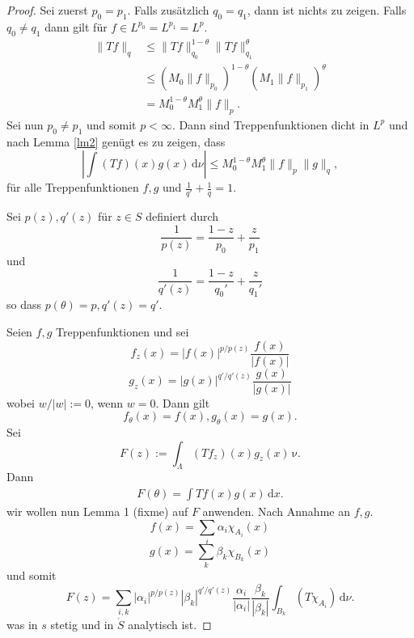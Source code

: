 \documentclass[
paper=a4,
bibtotocnumbered,
liststotocnumbered,
tablecaptionabove,
pointlessnumbers,
twoside,
openright,
10pt
]
{report}
\theoremstyle{definition}
\numberwithin{equation}{chapter}
\begin{document}
\begin{proof}
Sei zuerst $p_0=p_1$. Falls zusätzlich  $q_0=q_1$, dann ist nichts zu zeigen.  Falls $q_0\neq q_1$ dann gilt für $f\in L^{p_0} = L^{p_1} = L^p$.
\begin{align*}
\| Tf\|_q &\le \| Tf\|_{q_0}^{1-\theta} \| Tf\|_{q_1}^\theta\\
&\le (M_0 \| f\|_{p_0})^{1-\theta} (M_1 \| f\|_{p_1} )^\theta \\
&= M_0^{1-\theta} M_1^\theta \| f\|_p.
\end{align*}
Sei nun $p_0 \neq p_1$ und somit $p<\infty$. Dann sind Treppenfunktionen dicht in $L^p$ und nach Lemma \ref{lm2} genügt es zu zeigen, dass
\begin{equation}
|\int (Tf) (x) g(x) \, \mathrm d\nu| \le M_0^{1-\theta} M_1^\theta \| f\|_p \| g\|_q,
\end{equation}
für alle Treppenfunktionen $f,g$ und $\frac{1}{q'} + \frac{1}{q} =1$.

Sei $p(z), q'(z)$ für $z\in S$ definiert durch
\begin{equation}
\frac{1}{p(z)} = \frac{1-z}{p_0} + \frac{z}{p_1} 
\end{equation}
und
\begin{equation}
\frac{1}{q'(z)} = \frac{1-z}{q_0'} + \frac{z}{q_1'}
\end{equation}
so dass $p(\theta)=p, q'(z)=q'$.

Seien $f,g$ Treppenfunktionen und sei 
\begin{equation}
f_z(x)= |f(x)|^{p/p(z)} \frac{f(x)}{|f(x)|}
\end{equation}
\begin{equation}
g_z(x) = |g(x)|^{q'/q'(z)} \frac{g(x)}{|g(x)|}
\end{equation}
wobei $w/|w|:=0$, wenn $w=0$.  Dann gilt
\begin{equation}
f_\theta (x) = f(x), g_{\theta}(x) = g(x).
\end{equation}
Sei
\begin{equation}
F(z) := \int_\Lambda (Tf_z) (x) g_z(x) \, \mathrm  \nu.
\end{equation}
Dann 
\begin{align*}
F(\theta) = \int Tf(x) g(x) \, \mathrm dx.
\end{align*}
wir wollen nun Lemma 1 (fixme) auf $F$ anwenden.  Nach Annahme an $f,g$.
\begin{equation}
f(x) = \sum_{i} \alpha_i \chi_{A_i} (x)
\end{equation}
\begin{equation}
g(x) = \sum_{k} \beta_k \chi_{B_k} (x)
\end{equation}
und somit
\begin{equation}\label{eq:16.6bes}
F(z) = \sum_{i,k} |\alpha_i|^{p/p(z)} |\beta_k |^{q'/q'(z)} \frac{\alpha_i}{|\alpha_i|} \frac{\beta_k}{|\beta_k|} \int_{B_k} (T\chi_{A_i}) \, \mathrm d\nu.
\end{equation}
was in $s$ stetig und in $\mathring{S}$ analytisch ist.


\end{proof}
\end{document}
